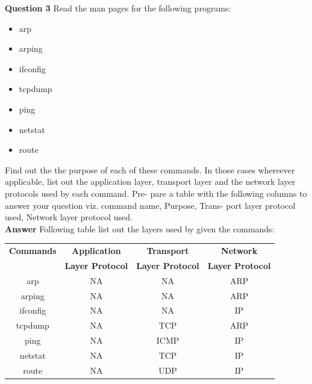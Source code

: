 \documentclass[14pt]{extarticle}
\begin{document}
    \noindent
    \textbf{\large Question 3}
    Read the man pages for the following programs:
    \begin{itemize}
        \item arp
        \item arping
        \item ifconfig
        \item tcpdump
        \item ping
        \item netstat
        \item route
    \end{itemize}
    Find out the the purpose of each of these commands. In those cases whereever applicable, list out
    the application layer, transport layer and the network layer protocols used by each command. Pre-
    pare a table with the following columns to answer your question viz. command name, Purpose, Trans-
    port layer protocol used, Network layer protocol used.\\[10pt]    
    \textbf{\large Answer}
    Following table list out the layers used by given the commands:
    \begin{table}[!h]
        \begin{center}
            \begin{tabular}{c|c|c|c}
                \textbf{Commands} & \textbf{Application}  & \textbf{Transport} & \textbf{Network} \\ 
                & \textbf{Layer Protocol} & \textbf{Layer Protocol} & \textbf{Layer Protocol}  \\ 
                \hline
                arp & NA & NA & ARP \\
                \hline
                arping & NA & NA & ARP\\
                \hline
                ifconfig & NA & NA & IP\\
                \hline
                tcpdump & NA & TCP & ARP\\
                \hline
                ping & NA & ICMP & IP\\
                \hline
                netstat & NA & TCP & IP\\
                \hline
                route & NA & UDP & IP
            \end{tabular}    
        \end{center}
    \end{table}
\end{document}
